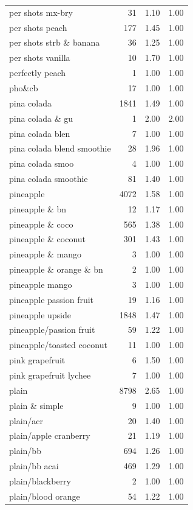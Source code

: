 \begin{table}
\begin{tabular}{lrrr}
per shots mx-bry & 31 & 1.10 & 1.00 \\
per shots peach & 177 & 1.45 & 1.00 \\
per shots strb \& banana & 36 & 1.25 & 1.00 \\
per shots vanilla & 10 & 1.70 & 1.00 \\
perfectly peach & 1 & 1.00 & 1.00 \\
pho\&cb & 17 & 1.00 & 1.00 \\
pina colada & 1841 & 1.49 & 1.00 \\
pina colada \& gu & 1 & 2.00 & 2.00 \\
pina colada blen & 7 & 1.00 & 1.00 \\
pina colada blend smoothie & 28 & 1.96 & 1.00 \\
pina colada smoo & 4 & 1.00 & 1.00 \\
pina colada smoothie & 81 & 1.40 & 1.00 \\
pineapple & 4072 & 1.58 & 1.00 \\
pineapple \& bn & 12 & 1.17 & 1.00 \\
pineapple \& coco & 565 & 1.38 & 1.00 \\
pineapple \& coconut & 301 & 1.43 & 1.00 \\
pineapple \& mango & 3 & 1.00 & 1.00 \\
pineapple \& orange \& bn & 2 & 1.00 & 1.00 \\
pineapple mango & 3 & 1.00 & 1.00 \\
pineapple passion fruit & 19 & 1.16 & 1.00 \\
pineapple upside & 1848 & 1.47 & 1.00 \\
pineapple/passion fruit & 59 & 1.22 & 1.00 \\
pineapple/toasted coconut & 11 & 1.00 & 1.00 \\
pink grapefruit & 6 & 1.50 & 1.00 \\
pink grapefruit lychee & 7 & 1.00 & 1.00 \\
plain & 8798 & 2.65 & 1.00 \\
plain \& simple & 9 & 1.00 & 1.00 \\
plain/acr & 20 & 1.40 & 1.00 \\
plain/apple cranberry & 21 & 1.19 & 1.00 \\
plain/bb & 694 & 1.26 & 1.00 \\
plain/bb acai & 469 & 1.29 & 1.00 \\
plain/blackberry & 2 & 1.00 & 1.00 \\
plain/blood orange & 54 & 1.22 & 1.00 \\

\end{tabular}
\end{table}
